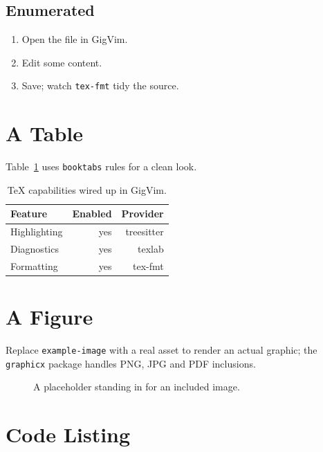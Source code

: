 \documentclass[11pt,a4paper]{article}
\begin{document}
\subsection{Enumerated}
\begin{enumerate}
  \item Open the file in GigVim.
  \item Edit some content.
  \item Save; watch \texttt{tex-fmt} tidy the source.
\end{enumerate}

\section{A Table}
\label{sec:table}

Table~\ref{tab:results} uses \texttt{booktabs} rules for a clean look.

\begin{table}[ht]
  \centering
  \begin{tabular}{lrr}
    \toprule
    Feature     & Enabled & Provider      \\
    \midrule
    Highlighting & yes     & treesitter    \\
    Diagnostics  & yes     & texlab        \\
    Formatting   & yes     & tex-fmt       \\
    \bottomrule
  \end{tabular}
  \caption{TeX capabilities wired up in GigVim.}
  \label{tab:results}
\end{table}

\section{A Figure}
\label{sec:figure}

Replace \texttt{example-image} with a real asset to render an actual graphic;
the \texttt{graphicx} package handles PNG, JPG and PDF inclusions.

\begin{figure}[ht]
  \centering
  \caption{A placeholder standing in for an included image.}
  \label{fig:placeholder}
\end{figure}

\section{Code Listing}
\label{sec:code}
\end{document}
